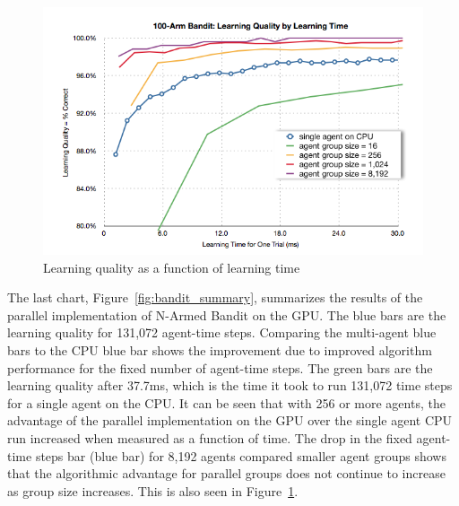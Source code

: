 \documentclass[11pt]{article} %
\begin{document}
\begin{figure}[hbtp]
\center
\includegraphics[scale=0.5]{fig03a}
\caption{Learning quality as a function of learning time}
\label{fig:bandit_time}
\end{figure}

\begin{flushleft}

The last chart, Figure~\ref{fig:bandit_summary}, summarizes the results of the parallel implementation of N-Armed Bandit on the GPU.  The blue bars are the learning quality for 131,072 agent-time steps.  Comparing the multi-agent blue bars to the CPU blue bar shows the improvement due to improved algorithm performance for the fixed number of agent-time steps.  The green bars are the learning quality after 37.7ms, which is the time it took to run 131,072 time steps for a single agent on the CPU.  It can be seen that with 256 or more agents, the advantage of the parallel implementation on the GPU over the single agent CPU run increased when measured as a function of time.  The drop in the fixed agent-time steps bar (blue bar) for 8,192 agents compared smaller agent groups shows that the algorithmic advantage for parallel groups does not continue to increase as group size increases.  This is also seen in Figure~\ref{fig:bandit_time}.



\end{flushleft}
\end{document}
